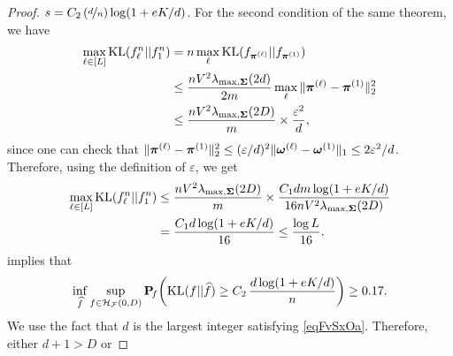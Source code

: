 \begin{proof}
	$s= C_2\,(\nicefrac{d}{n})\log(1+e  K/d)$.  For the second condition of the same theorem, 
	we have
	\begin{align}
	\max_{\ell\in[L]}{\rm KL}(f^n_{\ell}||f^n_{1}) &= n\max_{\ell}{\rm KL}(f_{\boldsymbol \pi^{(\ell)}}||f_{\boldsymbol \pi^{(1)}})\\
	&\leq \frac{ n V^2\lambda_{\max,\boldsymbol\Sigma}(2d)}{2m}\max_\ell \|\boldsymbol \pi^{(\ell)} - \boldsymbol \pi^{(1)}\|_2^2\\
	&\leq \frac{ n V^2\lambda_{\max,\boldsymbol\Sigma}(2D)}{m} \times \frac{\varepsilon^2}{d},
	\end{align}
	since one can check that $\|\boldsymbol \pi^{(\ell)} - \boldsymbol \pi^{(1)}\|_2^2 \le (\varepsilon/d)^2 
	\|\boldsymbol \omega^{(\ell)}-\boldsymbol \omega^{(1)}\|_1\le 2\varepsilon^2/d$. Therefore, using the definition 
	of $\varepsilon$, we get
	\begin{align}
	\max_{\ell\in[L]}{\rm KL}(f^n_{\ell}||f^n_{1}) 
	&\le \frac{ n V^2\lambda_{\max,\boldsymbol\Sigma}(2D)}{m}\times\frac{C_1dm\log(1+e  K/d)}
	{16 nV^2\lambda_{\max,\boldsymbol\Sigma}(2D)}\\
	&= \frac{C_1d\log(1+e  K/d)}{16}\le \frac{\log L}{16}.
	\end{align}
	 implies that
	\begin{equation}\label{eqFvSxTwa}
	\inf_{\widehat f}\sup_{f \in \mathcal H_\mathcal F(0,D)}\mathbf P\!_{f}\bigg({\rm KL}(f||\widehat f)\geq
	C_2\,\frac{d\log(1+e  K/d)}{n}\bigg)\geq 0.17.
	\end{equation}
	We use the fact that $d$ is the largest integer satisfying 
	\eqref{eqFvSxOa}. Therefore, either $d+1>D$ or 

\end{proof}
